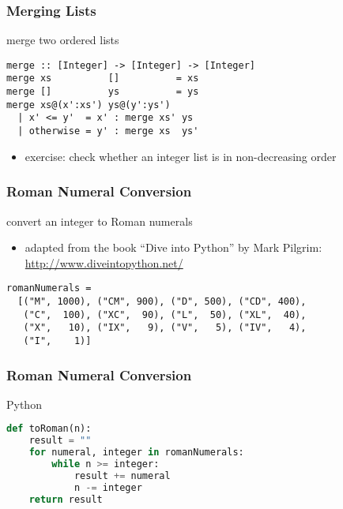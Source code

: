 \documentclass[dvipsnames]{beamer}
\theoremstyle{plain}
\begin{document}
\begin{frame}[fragile]
  \frametitle{Merging Lists}

  \begin{exampleblock}{merge two ordered lists}
    \begin{lstlisting}
merge :: [Integer] -> [Integer] -> [Integer]
merge xs          []          = xs
merge []          ys          = ys
merge xs@(x':xs') ys@(y':ys')
  | x' <= y'  = x' : merge xs' ys
  | otherwise = y' : merge xs  ys'
    \end{lstlisting}
  \end{exampleblock}

  \pause
  \begin{itemize}
    \item exercise: check whether an integer list is in non-decreasing order
  \end{itemize}
\end{frame}

\begin{frame}[fragile]
  \frametitle{Roman Numeral Conversion}


  \begin{exampleblock}{convert an integer to Roman numerals}
    \begin{itemize}
      \item adapted from the book ``Dive into Python'' by Mark Pilgrim:\\
        \url{http://www.diveintopython.net/}
    \end{itemize}

    \medskip
    \begin{lstlisting}
romanNumerals =
  [("M", 1000), ("CM", 900), ("D", 500), ("CD", 400),
   ("C",  100), ("XC",  90), ("L",  50), ("XL",  40),
   ("X",   10), ("IX",   9), ("V",   5), ("IV",   4),
   ("I",    1)]
    \end{lstlisting}
  \end{exampleblock}
\end{frame}

\begin{frame}[fragile]
  \frametitle{Roman Numeral Conversion}

  \begin{exampleblock}{Python}
    \begin{lstlisting}[language=Python]
def toRoman(n):
    result = ""
    for numeral, integer in romanNumerals:
        while n >= integer:
            result += numeral
            n -= integer
    return result
    \end{lstlisting}
  \end{exampleblock}
\end{frame}
\end{document}
